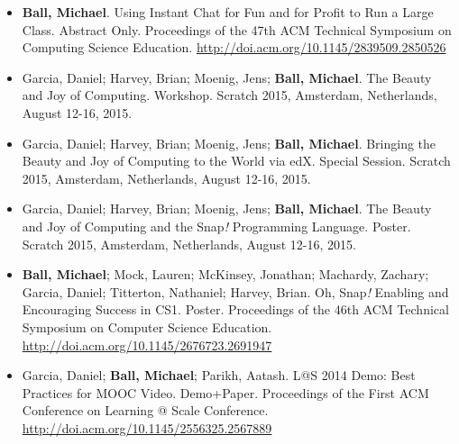\begin{itemize}
    \item{\textbf{Ball, Michael}. Using Instant Chat for Fun and for Profit to Run a Large Class. Abstract Only. Proceedings of the 47th ACM Technical Symposium on Computing Science Education.} \href{http://doi.acm.org/10.1145/2839509.2850526}{http://doi.acm.org/10.1145/2839509.2850526}
    

    \item{Garcia, Daniel; Harvey, Brian; Moenig, Jens; \textbf{Ball, Michael}. The Beauty and Joy of Computing. Workshop. Scratch 2015, Amsterdam, Netherlands, August 12-16, 2015.}

    \item{Garcia, Daniel; Harvey, Brian; Moenig, Jens; \textbf{Ball, Michael}. Bringing the Beauty and Joy of Computing to the World via edX. Special Session. Scratch 2015, Amsterdam, Netherlands, August 12-16, 2015.}

    \item{Garcia, Daniel; Harvey, Brian; Moenig, Jens; \textbf{Ball, Michael}. The Beauty and Joy of Computing and the Snap\textit{!} Programming Language. Poster. Scratch 2015, Amsterdam, Netherlands, August 12-16, 2015.}

    \item{\textbf{Ball, Michael}; Mock, Lauren; McKinsey, Jonathan; Machardy, Zachary; Garcia, Daniel; Titterton, Nathaniel; Harvey, Brian. Oh, Snap\textit{!} Enabling and Encouraging Success in CS1. Poster. Proceedings of the 46th ACM Technical Symposium on Computer Science Education.} \newline\href{http://doi.acm.org/10.1145/2676723.2691947}{http://doi.acm.org/10.1145/2676723.2691947}
    

    \item{Garcia, Daniel; \textbf{Ball, Michael}; Parikh, Aatash. L@S 2014 Demo: Best Practices for MOOC Video. Demo+Paper. Proceedings of the First ACM Conference on Learning @ Scale Conference.} \href{http://doi.acm.org/10.1145/2556325.2567889}{http://doi.acm.org/10.1145/2556325.2567889}

\end{itemize}
